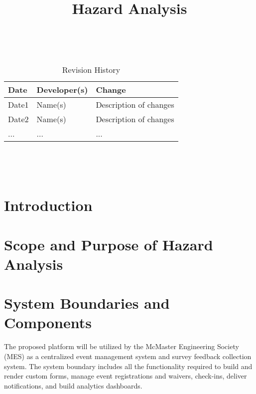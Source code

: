 \documentclass{article}
\title{Hazard Analysis\\\progname}
\author{\authname}
\date{}
\begin{document}
\maketitle
\thispagestyle{empty}

~\newpage


\begin{table}[hp]
\caption{Revision History} \label{TblRevisionHistory}
\begin{tabularx}{\textwidth}{llX}
\toprule
\textbf{Date} & \textbf{Developer(s)} & \textbf{Change}\\
\midrule
Date1 & Name(s) & Description of changes\\
Date2 & Name(s) & Description of changes\\
... & ... & ...\\
\bottomrule
\end{tabularx}
\end{table}

~\newpage

\tableofcontents

~\newpage



\section{Introduction}


\section{Scope and Purpose of Hazard Analysis}


\section{System Boundaries and Components}

The proposed platform will be utilized by the McMaster Engineering Society (MES)
as a centralized event management system and survey feedback collection system.
The system boundary includes all the functionality required to build and render
custom forms, manage event registrations and waivers, check-ins, deliver
notifications, and build analytics dashboards.
\end{document}
